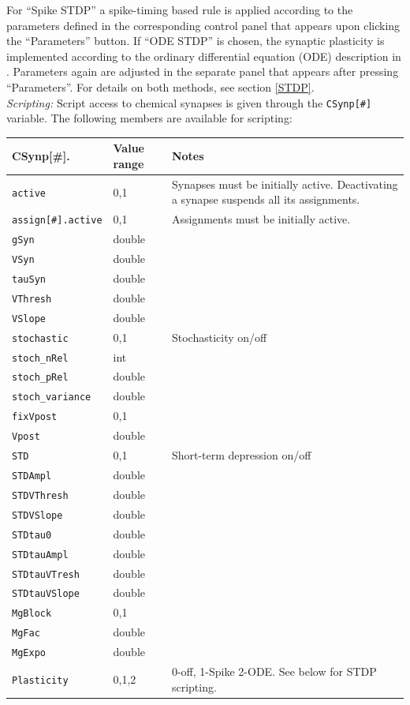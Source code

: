 \documentclass{article}
\begin{document}
%
For ``Spike STDP'' a spike-timing based
  rule is applied according to the parameters defined in the
  corresponding control panel that appears upon clicking the
  ``Parameters'' button.
  If ``ODE STDP'' is chosen, the synaptic
  plasticity is implemented according to the ordinary differential
  equation (ODE) description in \cite{Abarbanel2002}. Parameters again
  are adjusted in the separate panel that appears after pressing
  ``Parameters''. For details on both methods, see section \ref{STDP}.\\

\noindent
\emph{Scripting:} Script access to chemical synapses is given through the \texttt{CSynp[\#]} variable.
The following members are available for scripting: \\
\begin{tabularx}{\linewidth}{|ll|X|}
	\hline
	{\bf CSynp[\#].\textvisiblespace} & {\bf Value range} & {\bf Notes} \\
	\hline
	\texttt{active} & 0,1 & Synapses must be initially active. Deactivating a synapse suspends all
	its assignments. \\
	\texttt{assign[\#].active} & 0,1 & Assignments must be initially active. \\
	\texttt{gSyn} & double & \\
	\texttt{VSyn} & double & \\
	\texttt{tauSyn} & double & \\
	\texttt{VThresh} & double & \\
	\texttt{VSlope} & double & \\
	\texttt{stochastic} & 0,1 & Stochasticity on/off \\
	\texttt{stoch\_nRel} & int & \\
	\texttt{stoch\_pRel} & double & \\
	\texttt{stoch\_variance} & double & \\
	\texttt{fixVpost} & 0,1 & \\
	\texttt{Vpost} & double & \\
	\texttt{STD} & 0,1 & Short-term depression on/off \\
	\texttt{STDAmpl} & double & \\
	\texttt{STDVThresh} & double & \\
	\texttt{STDVSlope} & double & \\
	\texttt{STDtau0} & double & \\
	\texttt{STDtauAmpl} & double & \\
	\texttt{STDtauVTresh} & double & \\
	\texttt{STDtauVSlope} & double & \\
	\texttt{MgBlock} & 0,1 & \\
	\texttt{MgFac} & double & \\
	\texttt{MgExpo} & double & \\
	\texttt{Plasticity} & 0,1,2 & 0-off, 1-Spike 2-ODE. See below for STDP scripting.\\
	\hline
\end{tabularx}
\end{document}
